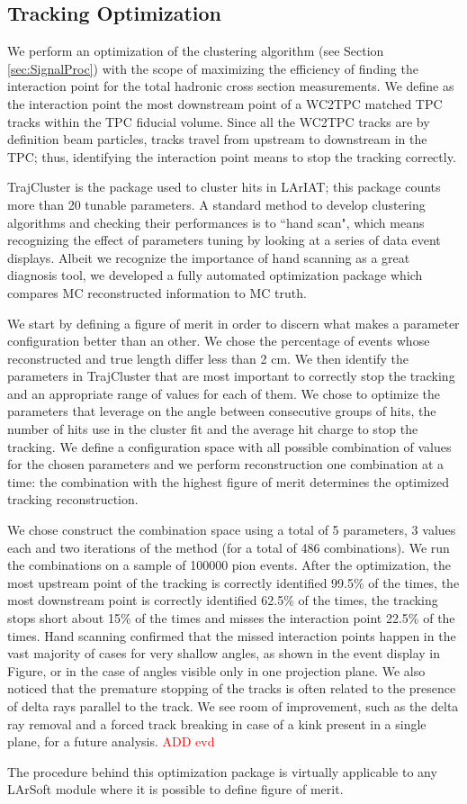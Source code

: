 \subsection{Tracking Optimization}\label{ch:TrackOptimization}
We perform an optimization of the clustering algorithm (see Section \ref{sec:SignalProc}) with the scope of maximizing the efficiency of finding the interaction point for the total hadronic cross section measurements. We define as the interaction point the most downstream point of a WC2TPC matched TPC tracks within the TPC fiducial volume. Since all the WC2TPC tracks are by definition beam particles, tracks travel from upstream to downstream in the TPC; thus, identifying the interaction point means to stop the tracking correctly. 

TrajCluster is the package used to cluster hits in LArIAT; this package counts more than 20 tunable parameters. A standard method to develop clustering algorithms and checking their performances is to ``hand scan", which means recognizing the effect of parameters tuning by looking at a series of data event displays. Albeit we recognize the importance of hand scanning as a great diagnosis tool, we developed a fully automated optimization package which compares MC reconstructed information to MC truth. 

We start by defining a figure of merit in order to discern what makes a parameter configuration better than an other. We chose the percentage of events whose reconstructed and true length differ less than 2 cm. We then identify the parameters in TrajCluster that are most important to  correctly stop  the tracking and an appropriate range of values for each of them. We chose to optimize the parameters that leverage on the angle between consecutive groups of hits, the number of hits use in the cluster fit and the average hit charge to stop the tracking. We define a configuration space with all  possible combination of values for the chosen parameters and we perform reconstruction one combination at a time: the combination with the highest figure of merit determines the optimized tracking reconstruction.

We chose construct the combination space using a total of 5 parameters, 3 values each and two iterations of the method (for a total of 486 combinations). We run the combinations on a sample of 100000 pion events. 
After the optimization, the most upstream point of the tracking is correctly identified 99.5\% of the times, the most downstream point is correctly identified 62.5\% of the times, the tracking stops short about 15\% of the times and misses the interaction point 22.5\% of the times. Hand scanning confirmed that the missed interaction points happen in the vast majority of cases for very shallow angles, as shown in the event display in Figure, or in the case of angles visible only in one projection plane. We also noticed that the premature stopping of the tracks is often related to the presence of delta rays parallel to the track. We see room of improvement, such as the delta ray removal and a forced track breaking in case of a kink present in a single plane, for a future analysis. \textcolor{red}{ADD evd}

The procedure behind this optimization package is virtually applicable to any LArSoft module where it is possible to define figure of merit.

